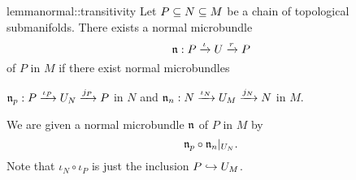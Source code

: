 \begin{mystatement}{lemma}{normal::transitivity}
    Let $P \sub N \sub M$ be a chain of topological submanifolds.
    There exists a normal microbundle
    \[ \bundledef{\bn}{P}{U}{\iota}{r} \]
    of $P$ in $M$ if there exist normal microbundles
    \begin{center}
        $\bundledef{\bn_p}{P}{U_N}{\iota_P}{j_P}$ in $N$ and $\bundledef{\bn_n}{N}{U_M}{\iota_N}{j_N}$ in $M$.
    \end{center}
\end{mystatement}

\begin{myproof}
    We are given a normal microbundle $\bn$ of $P$ in $M$ by
    \[ \bn_p \circ \bn_n\restr{U_N}. \]
    Note that $\iota_N \circ \iota_P$ is just the inclusion $P \incl U_M$.
\end{myproof}
